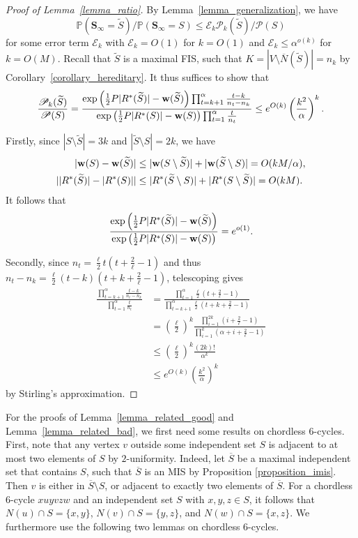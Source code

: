 \documentclass{article}
\theoremstyle{plain}
\theoremstyle{remark}
\theoremstyle{plain}
\numberwithin{equation}{section}
\renewcommand{\b}{{\bf{w}}}
\begin{document}
	\begin{proof}[Proof of Lemma~\ref{lemma_ratio}]
		By Lemma~\ref{lemma_generalization}, we have $$\mathbb{P}(\boldsymbol{S}_{\infty}=\widetilde{S})/\mathbb{P}(\boldsymbol{S}_{\infty}=S)\leq\mathscr{E}_k\mathscr{P}_k(\widetilde{S})/\mathscr{P}(S)$$ for some error term $\mathscr{E}_k$ with $\mathscr{E}_k=O(1)$ for $k=O(1)$ and $\mathscr{E}_k\leq\alpha^{o(k)}$ for $k=O(M)$. Recall that $\widetilde{S}$ is a maximal FIS, such that $K=|V\setminus\overline{N}(\widetilde{S})|=n_k$ by Corollary~\ref{corollary_hereditary}. It thus suffices to show that $$\frac{\mathscr{P}_k(\widetilde{S})}{\mathscr{P}(S)}=\frac{\exp\left(\frac12P|R^*(\widetilde{S})|-\b(\widetilde{S})\right)\prod_{t=k+1}^\alpha\frac{t-k}{n_t-n_k}}{\exp\left(\frac12P|R^*(S)|-\b(S)\right)\prod_{t=1}^\alpha\frac{t}{n_t}}\leq e^{O(k)}\left(\frac{k^2}{\alpha}\right)^k.$$
		
		Firstly, since $|S\setminus\widetilde{S}|=3k$ and $|\widetilde{S}\setminus S|=2k$, we have
		\begin{align}
			|\b(S)-\b(\widetilde{S})|&\leq|\b(S\setminus\widetilde{S})|+|\b(\widetilde{S}\setminus S)|=O(kM/\alpha),
			\\||R^*(\widetilde{S})|-|R^*(S)||&\leq|R^*(\widetilde{S}\setminus S)|+|R^*(S\setminus\widetilde{S})|=O(kM).
		\end{align}
		It follows that $$\frac{\exp\left(\tfrac12P|R^*(\widetilde{S})|-\b(\widetilde{S})\right)}{\exp\left(\tfrac12P|R^*(S)|-\b(S)\right)}=e^{o(1)}.$$
		
		Secondly, since $n_t=\tfrac{\ell}{2}t(t+\tfrac{2}{\ell}-1)$ and thus $n_t-n_k=\tfrac{\ell}{2}(t-k)(t+k+\tfrac{2}{\ell}-1)$, telescoping gives
		\begin{align}
			\frac{\prod_{t=k+1}^\alpha\frac{t-k}{n_t-n_k}}{\prod_{t=1}^\alpha\frac{t}{n_t}}
			&=\frac{\prod_{t=1}^{\alpha}\frac{\ell}{2}(t+\frac{2}{\ell}-1)}{\prod_{t=k+1}^{\alpha}\frac{\ell}{2}(t+k+\frac{2}{\ell}-1)}
			\\&=\left(\frac{\ell}{2}\right)^k\frac{\prod_{i=1}^{2k}(i+\frac{2}{\ell}-1)}{\prod_{i=1}^{k}(\alpha+i+\frac{2}{\ell}-1)}
			\\&\leq\left(\frac{\ell}{2}\right)^k\frac{(2k)!}{\alpha^k}
			\\&\leq e^{O(k)}\left(\frac{k^2}{\alpha}\right)^k
		\end{align}
		by Stirling's approximation.
	\end{proof}
	
	For the proofs of Lemma~\ref{lemma_related_good} and Lemma~\ref{lemma_related_bad}, we first need some results on chordless $6$-cycles. First, note that any vertex $v$ outside some independent set $S$ is adjacent to at most two elements of $S$ by $2$-uniformity. Indeed, let $\overline{S}$ be a maximal independent set that contains $S$, such that $\overline{S}$ is an MIS by Proposition \ref{proposition_imis}. Then $v$ is either in $\overline{S}\setminus S$, or adjacent to exactly two elements of $\overline{S}$. For a chordless $6$-cycle $xuyvzw$ and an independent set $S$ with $x,y,z\in S$, it follows that $N(u)\cap S=\{x,y\}$, $N(v)\cap S=\{y,z\}$, and $N(w)\cap S=\{x,z\}$. We furthermore use the following two lemmas on chordless $6$-cycles.
	
\end{document}
